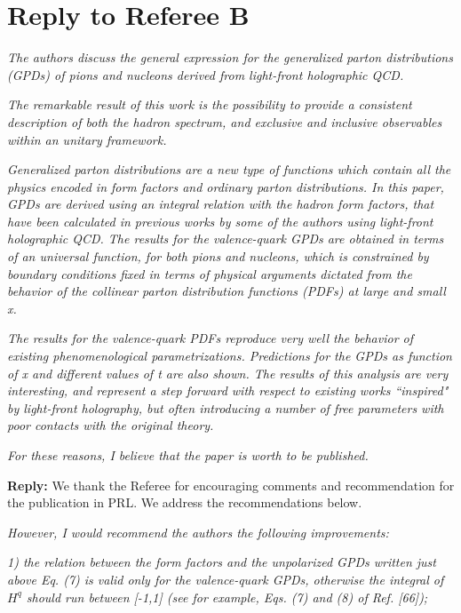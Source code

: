 \documentclass[12pt]{article}
\begin{document}
\newpage


\section*{Reply to Referee B}

{\it The authors discuss the general expression for the generalized parton
distributions (GPDs) of pions and nucleons derived from light-front
holographic QCD.}

{\it The remarkable result of this work is the possibility to provide a
consistent description of both the hadron spectrum, and exclusive and
inclusive observables within an unitary framework.}

{\it Generalized parton distributions are a new type of functions which
contain all the physics encoded in form factors and ordinary parton
distributions. In this paper, GPDs are derived using an integral
relation with the hadron form factors, that have been calculated in
previous works by some of the authors using light-front holographic
QCD. The results for the valence-quark GPDs are obtained in terms of
an universal function, for both pions and nucleons, which is
constrained by boundary conditions fixed in terms of physical
arguments dictated from the behavior of the collinear parton
distribution functions (PDFs) at large and small x.}

{\it The results for the valence-quark PDFs reproduce very well the
behavior of existing phenomenological parametrizations. Predictions
for the GPDs as function of x and different values of t are also
shown. The results of this analysis are very interesting, and
represent a step forward with respect to existing works ``inspired" by
light-front holography, but often introducing a number of free
parameters with poor contacts with the original theory.}

{\it For these reasons, I believe that the paper is worth to be published.}

{\bf Reply:} We thank the Referee for encouraging comments and  recommendation for the publication in PRL. We address the recommendations below.

{\it However, I would recommend the authors the following improvements:}

{\it 1) the relation between the form factors and the unpolarized GPDs
written just above Eq. (7) is valid only for the valence-quark GPDs,
otherwise the integral of $H^q$ should run between [-1,1] (see for
example, Eqs. (7) and (8) of Ref. [66]);}
\end{document}

